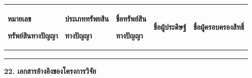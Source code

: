 \documentclass[16pt]{extarticle}
\newcounter{none} %
\begin{document}
{\def\LTcaptype{none} %
\begin{longtable}[]{@{}
  >{\raggedright\arraybackslash}p{}
  >{\raggedright\arraybackslash}p{}
  >{\raggedright\arraybackslash}p{}
  >{\raggedright\arraybackslash}p{}
  >{\raggedright\arraybackslash}p{}@{}}
\toprule\noalign{}
\begin{minipage}[b]{\linewidth}\centering
\textbf{หมายเลข}

\textbf{ทรัพย์สินทางปัญญา}
\end{minipage} & \begin{minipage}[b]{\linewidth}\centering
\textbf{ประเภททรัพยสิน}

\textbf{ทางปัญญา}
\end{minipage} & \begin{minipage}[b]{\linewidth}\centering
\textbf{ชื่อทรัพย์สิน}

\textbf{ทางปัญญา}
\end{minipage} & \begin{minipage}[b]{\linewidth}\centering
\textbf{ชื่อผู้ประดิษฐ์}
\end{minipage} & \begin{minipage}[b]{\linewidth}\centering
\textbf{ชื่อผู้ครอบครองสิทธิ์}
\end{minipage} \\
\midrule\noalign{}
\endhead
\bottomrule\noalign{}
\endlastfoot
& & & & \\
& & & & \\
& & & & \\
\end{longtable}
}

\textbf{22. เอกสารอ้างอิงของโครงการวิจัย}
\end{document}
